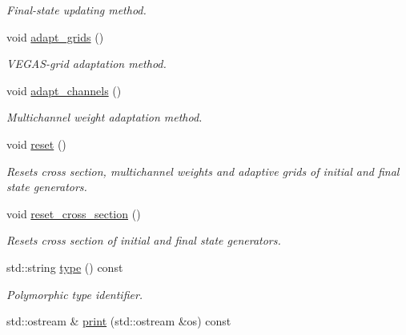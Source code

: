 \begin{DoxyCompactItemize}
\begin{DoxyCompactList}\small\item\em Final-\/state updating method. \end{DoxyCompactList}\item 
\hypertarget{a00446_aea3bf4452d916c6f2bcee3113b95757d}{void \hyperlink{a00446_aea3bf4452d916c6f2bcee3113b95757d}{adapt\-\_\-grids} ()}\label{a00446_aea3bf4452d916c6f2bcee3113b95757d}

\begin{DoxyCompactList}\small\item\em V\-E\-G\-A\-S-\/grid adaptation method. \end{DoxyCompactList}\item 
\hypertarget{a00446_a33c57e0755699c912dde1bebf87e2dcc}{void \hyperlink{a00446_a33c57e0755699c912dde1bebf87e2dcc}{adapt\-\_\-channels} ()}\label{a00446_a33c57e0755699c912dde1bebf87e2dcc}

\begin{DoxyCompactList}\small\item\em Multichannel weight adaptation method. \end{DoxyCompactList}\item 
void \hyperlink{a00446_a90bbb01bed864774aca7f08af0a33982}{reset} ()
\begin{DoxyCompactList}\small\item\em Resets cross section, multichannel weights and adaptive grids of initial and final state generators. \end{DoxyCompactList}\item 
\hypertarget{a00446_a91b224ef9d41bbc7b08f1d2a405d4860}{void \hyperlink{a00446_a91b224ef9d41bbc7b08f1d2a405d4860}{reset\-\_\-cross\-\_\-section} ()}\label{a00446_a91b224ef9d41bbc7b08f1d2a405d4860}

\begin{DoxyCompactList}\small\item\em Resets cross section of initial and final state generators. \end{DoxyCompactList}\item 
\hypertarget{a00446_ad12e96c4671fa9f80e02b583a0a809a0}{std\-::string \hyperlink{a00446_ad12e96c4671fa9f80e02b583a0a809a0}{type} () const }\label{a00446_ad12e96c4671fa9f80e02b583a0a809a0}

\begin{DoxyCompactList}\small\item\em Polymorphic type identifier. \end{DoxyCompactList}\item 
\hypertarget{a00446_acaa154d05a67743f3d0c96f6d798dd23}{std\-::ostream \& \hyperlink{a00446_acaa154d05a67743f3d0c96f6d798dd23}{print} (std\-::ostream \&os) const }\label{a00446_acaa154d05a67743f3d0c96f6d798dd23}


\end{DoxyCompactItemize}
